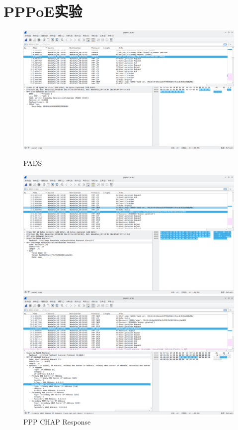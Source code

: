 \documentclass[a4paper]{article}
\begin{document}
\courseheader
{}
\section{PPPoE实验}
\begin{figure}[H]
    \centering
    \begin{minipage}[t]{0.45\linewidth}
        \centering
        \includegraphics[width=\linewidth]{PPPoE-1.png}
        \caption{PADS}
        \label{1}
    \end{minipage}
    \begin{minipage}[t]{0.45\linewidth}
        \centering
        \includegraphics[width=\linewidth]{PPPoE-2.png}
        \caption{PPP CHAP Response}
        \label{2}
    \end{minipage}
    \begin{minipage}[t]{0.45\linewidth}
        \centering
        \includegraphics[width=\linewidth]{PPPoE-3.png}

\end{minipage}
\end{figure}
\end{document}
